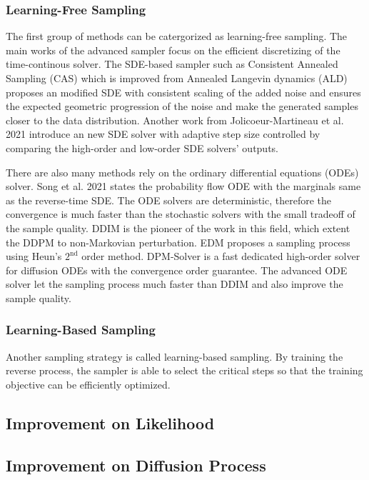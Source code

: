 \documentclass[12pt,DIV14,BCOR12mm,a4paper,footinclude=false,headinclude,parskip=half-,twoside,openright,cleardoublepage=empty,toc=index,bibliography=totoc,listof=totoc]{scrreprt}
\numberwithin{equation}{chapter}
\begin{document}
\subsubsection{Learning-Free Sampling}
The first group of methods can be catergorized as learning-free sampling. The main works of the advanced sampler focus on the efficient discretizing of the time-continous solver. The SDE-based sampler such as Consistent Annealed Sampling (CAS) \cite{jolicoeurmartineau2020adversarial} which is improved from Annealed Langevin dynamics (ALD) \cite{dockhorn2022scorebased} proposes an modified SDE with consistent scaling of the added noise and ensures the expected geometric progression of the noise and make the generated samples closer to the data distribution. Another work from Jolicoeur-Martineau et al. 2021 \cite{jolicoeurmartineau2021gotta} introduce an new SDE solver with adaptive step size controlled by comparing the high-order and low-order SDE solvers' outputs.

There are also many methods rely on the ordinary differential equations (ODEs) solver. Song et al. 2021 \cite{song2021scorebased} states the probability flow ODE with the marginals same as the reverse-time SDE. The ODE solvers are deterministic, therefore the convergence is much faster than the stochastic solvers with the small tradeoff of the sample quality. DDIM \cite{song2022denoising} is the pioneer of the work in this field, which extent the DDPM to non-Markovian perturbation. EDM proposes a sampling process using Heun's $2^{\text{nd}}$ order method. DPM-Solver \cite{lu2022dpmsolver} is a fast dedicated high-order solver for diffusion ODEs with the convergence order guarantee. The advanced ODE solver let the sampling process much faster than DDIM and also improve the sample quality.

\subsubsection{Learning-Based Sampling}
Another sampling strategy is called learning-based sampling. By training the reverse process, the sampler is able to select the critical steps so that the training objective can be efficiently optimized. 
\subsection{Improvement on Likelihood}

\subsection{Improvement on Diffusion Process}
\end{document}
